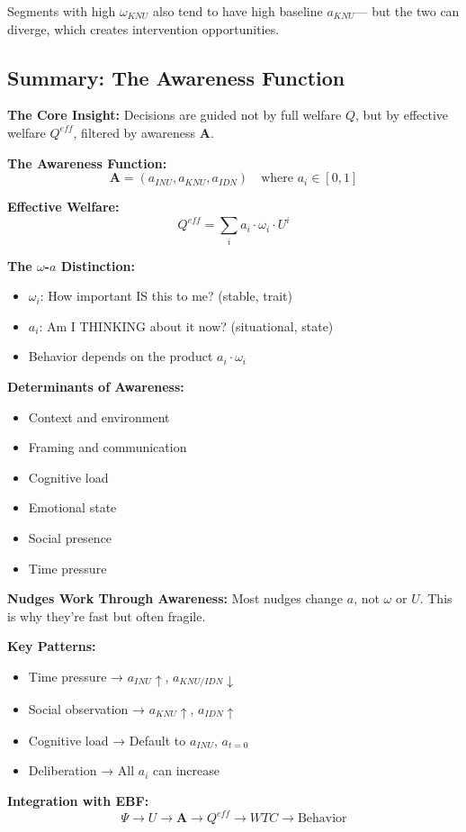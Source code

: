 Segments with high $\omega_{KNU}$ also tend to have high baseline $a_{KNU}$---
but the two can diverge, which creates intervention opportunities.

\subsection{Summary: The Awareness Function}
\label{subsec:awareness-summary}

\begin{tcolorbox}[colback=gray!5!white, colframe=gray!75!black, title=Chapter 11 Summary: Awareness]

\textbf{The Core Insight:}
Decisions are guided not by full welfare $Q$, but by effective welfare $Q^{eff}$,
filtered by awareness $\mathbf{A}$.

\textbf{The Awareness Function:}
$$\mathbf{A} = (a_{INU}, a_{KNU}, a_{IDN}) \quad \text{where } a_i \in [0,1]$$

\textbf{Effective Welfare:}
$$Q^{eff} = \sum_{i} a_i \cdot \omega_i \cdot U^i$$

\textbf{The $\omega$-$a$ Distinction:}
\begin{itemize}
\item $\omega_i$: How important IS this to me? (stable, trait)
\item $a_i$: Am I THINKING about it now? (situational, state)
\item Behavior depends on the product $a_i \cdot \omega_i$
\end{itemize}

\textbf{Determinants of Awareness:}
\begin{itemize}
\item Context and environment
\item Framing and communication
\item Cognitive load
\item Emotional state
\item Social presence
\item Time pressure
\end{itemize}

\textbf{Nudges Work Through Awareness:}
Most nudges change $a$, not $\omega$ or $U$. This is why they're fast but often fragile.

\textbf{Key Patterns:}
\begin{itemize}
\item Time pressure → $a_{INU} \uparrow$, $a_{KNU/IDN} \downarrow$
\item Social observation → $a_{KNU} \uparrow$, $a_{IDN} \uparrow$
\item Cognitive load → Default to $a_{INU}$, $a_{t=0}$
\item Deliberation → All $a_i$ can increase
\end{itemize}

\textbf{Integration with EBF:}
$$\Psi \rightarrow U \rightarrow \mathbf{A} \rightarrow Q^{eff} \rightarrow WTC \rightarrow \text{Behavior}$$

\end{tcolorbox}

